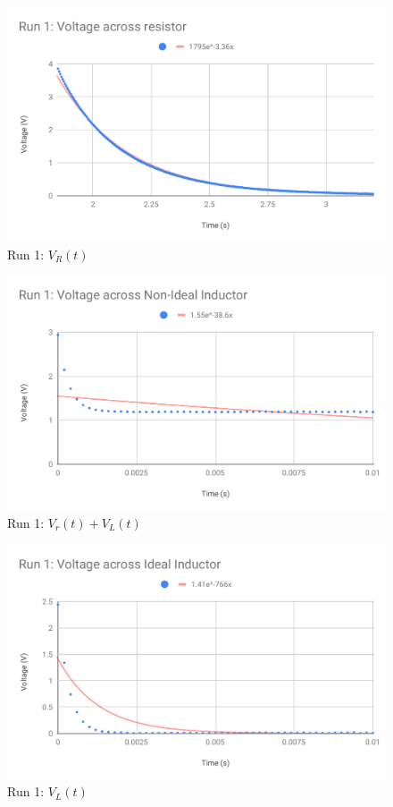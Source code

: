 \begin{figure}[ht]
    \centering
    \includegraphics[scale=0.74]{image/05-RC-RL/run-1-vR-no-tail.pdf}
    \caption{Run 1: $V_{R}(t)$}
    \label{figure.05.run.1.vR.no.tail}
\end{figure}
\begin{figure}[ht]
    \centering
    \includegraphics[scale=0.74]{image/05-RC-RL/vL-non-ideal-full.pdf}
    \caption{Run 1: $V_{r}(t) + V_{L}(t)$}
    \label{figure.05.vL.nonideal.full}
\end{figure}
\begin{figure}[ht]
    \centering
    \includegraphics[scale=0.74]{image/05-RC-RL/vL-full.pdf}
    \caption{Run 1: $V_{L}(t)$}
    \label{figure.05.vL.full}
\end{figure}
